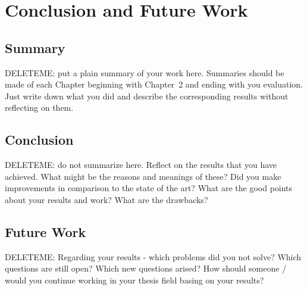 \chapter{Conclusion and Future Work}
\label{conclusion}
\section{Summary}
DELETEME: put a plain summary of your work here. Summaries should be made of each Chapter beginning with Chapter~2 and ending with you evaluation. Just write down what you did and describe the corresponding results without reflecting on them.

\section{Conclusion}
DELETEME: do not summarize here. Reflect on the results that you have achieved. What might be the reasons and meanings of these? Did you make improvements in comparison to the state of the art? What are the good points about your results and work? What are the drawbacks? 

\section{Future Work}
DELETEME: Regarding your results - which problems did you not solve? Which questions are still open? Which new questions arised? How should someone / would you continue working in your thesis field basing on your results?